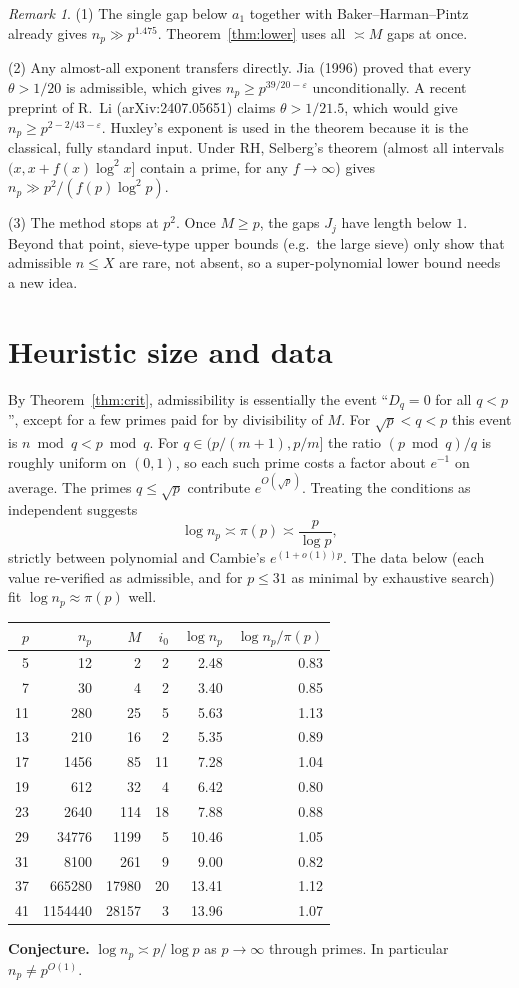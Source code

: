 \documentclass[11pt]{article}
\theoremstyle{remark}
\newtheorem*{remark}{Remark}
\begin{document}
\begin{remark}
(1) The single gap below $a_1$ together with Baker--Harman--Pintz already gives $n_p\gg p^{1.475}$. Theorem~\ref{thm:lower} uses all $\asymp M$ gaps at once.

(2) Any almost-all exponent transfers directly. Jia (1996) proved that every $\theta>1/20$ is admissible, which gives $n_p\ge p^{39/20-\varepsilon}$ unconditionally. A recent preprint of R.~Li (arXiv:2407.05651) claims $\theta>1/21.5$, which would give $n_p\ge p^{2-2/43-\varepsilon}$. Huxley's exponent is used in the theorem because it is the classical, fully standard input. Under RH, Selberg's theorem (almost all intervals $(x,x+f(x)\log^2x]$ contain a prime, for any $f\to\infty$) gives $n_p\gg p^2/(f(p)\log^2p)$.

(3) The method stops at $p^2$. Once $M\ge p$, the gaps $J_j$ have length below $1$. Beyond that point, sieve-type upper bounds (e.g.\ the large sieve) only show that admissible $n\le X$ are rare, not absent, so a super-polynomial lower bound needs a new idea.
\end{remark}

\section{Heuristic size and data}

By Theorem~\ref{thm:crit}, admissibility is essentially the event ``$D_q=0$ for all $q<p$'', except for a few primes paid for by divisibility of $M$. For $\sqrt p<q<p$ this event is $n\bmod q<p\bmod q$. For $q\in(p/(m+1),p/m]$ the ratio $(p\bmod q)/q$ is roughly uniform on $(0,1)$, so each such prime costs a factor about $e^{-1}$ on average. The primes $q\le\sqrt p$ contribute $e^{O(\sqrt p)}$. Treating the conditions as independent suggests
\[
\log n_p \asymp \pi(p)\asymp \frac{p}{\log p},
\]
strictly between polynomial and Cambie's $e^{(1+o(1))p}$. The data below (each value re-verified as admissible, and for $p\le31$ as minimal by exhaustive search) fit $\log n_p\approx\pi(p)$ well.

\begin{center}
\begin{tabular}{rrrrrr}
\toprule
$p$ & $n_p$ & $M$ & $i_0$ & $\log n_p$ & $\log n_p/\pi(p)$\\
\midrule
5 & 12 & 2 & 2 & 2.48 & 0.83\\
7 & 30 & 4 & 2 & 3.40 & 0.85\\
11 & 280 & 25 & 5 & 5.63 & 1.13\\
13 & 210 & 16 & 2 & 5.35 & 0.89\\
17 & 1456 & 85 & 11 & 7.28 & 1.04\\
19 & 612 & 32 & 4 & 6.42 & 0.80\\
23 & 2640 & 114 & 18 & 7.88 & 0.88\\
29 & 34776 & 1199 & 5 & 10.46 & 1.05\\
31 & 8100 & 261 & 9 & 9.00 & 0.82\\
37 & 665280 & 17980 & 20 & 13.41 & 1.12\\
41 & 1154440 & 28157 & 3 & 13.96 & 1.07\\
\bottomrule
\end{tabular}
\end{center}

\noindent\textbf{Conjecture.} $\log n_p\asymp p/\log p$ as $p\to\infty$ through primes. In particular $n_p\ne p^{O(1)}$.
\end{document}
